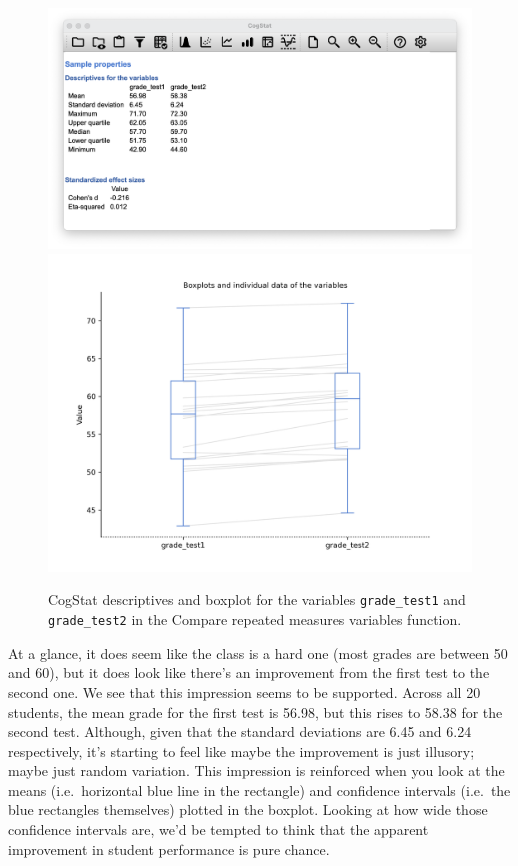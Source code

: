 \documentclass[
]{book}
\theoremstyle{definition}
\theoremstyle{definition}
\theoremstyle{definition}
\theoremstyle{definition}
\theoremstyle{remark}
\begin{document}
\begin{figure}

{\centering \includegraphics[width=0.66\linewidth]{resources/image/cogstatchicodescr} \includegraphics[width=0.66\linewidth]{resources/image/cogstatchicoboxplot} 

}

\caption{CogStat descriptives and boxplot for the variables \texttt{grade\_test1} and \texttt{grade\_test2} in the Compare repeated measures variables function.}\label{fig:chico}
\end{figure}

At a glance, it does seem like the class is a hard one (most grades are between 50 and 60), but it does look like there's an improvement from the first test to the second one. We see that this impression seems to be supported. Across all 20 students, the mean grade for the first test is 56.98, but this rises to 58.38 for the second test. Although, given that the standard deviations are 6.45 and 6.24 respectively, it's starting to feel like maybe the improvement is just illusory; maybe just random variation. This impression is reinforced when you look at the means (i.e.~horizontal blue line in the rectangle) and confidence intervals (i.e.~the blue rectangles themselves) plotted in the boxplot. Looking at how wide those confidence intervals are, we'd be tempted to think that the apparent improvement in student performance is pure chance.
\end{document}
